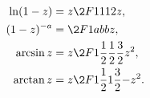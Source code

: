 \begin{subequations}
    \begin{align}
        \ln(1-z)&=z\2F1{1}{1}{2}{z},\\
        \label{eq:2F1Fraction}
        (1-z)^{-a}&=\2F1{a}{b}{b}{z},\\
        \arcsin{z}&=z\2F1{\frac{1}{2}}{\frac{1}{2}}{\frac{3}{2}}{z^{2}},\\
        \arctan{z}&=z\2F1{\frac{1}{2}}{1}{\frac{3}{2}}{-z^{2}}.	
    \end{align}
\end{subequations}